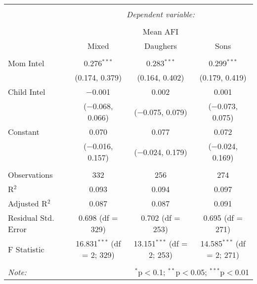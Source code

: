 
\begingroup 
\small 
\begin{tabular}{@{\extracolsep{1pt}}lccc} 
\\[-1.8ex]\hline 
\hline \\[-1.8ex] 
 & \multicolumn{3}{c}{\textit{Dependent variable:}} \\ 
\cline{2-4} 
\\[-1.8ex] & \multicolumn{3}{c}{Mean AFI} \\ 
 & Mixed & Daughers & Sons \\ 
\hline \\[-1.8ex] 
 Mom Intel & 0.276$^{***}$ & 0.283$^{***}$ & 0.299$^{***}$ \\ 
  & (0.174, 0.379) & (0.164, 0.402) & (0.179, 0.419) \\ 
  Child Intel & $-$0.001 & 0.002 & 0.001 \\ 
  & ($-$0.068, 0.066) & ($-$0.075, 0.079) & ($-$0.073, 0.075) \\ 
  Constant & 0.070 & 0.077 & 0.072 \\ 
  & ($-$0.016, 0.157) & ($-$0.024, 0.179) & ($-$0.024, 0.169) \\ 
 \hline \\[-1.8ex] 
Observations & 332 & 256 & 274 \\ 
R$^{2}$ & 0.093 & 0.094 & 0.097 \\ 
Adjusted R$^{2}$ & 0.087 & 0.087 & 0.091 \\ 
Residual Std. Error & 0.698 (df = 329) & 0.702 (df = 253) & 0.695 (df = 271) \\ 
F Statistic & 16.831$^{***}$ (df = 2; 329) & 13.151$^{***}$ (df = 2; 253) & 14.585$^{***}$ (df = 2; 271) \\ 
\hline 
\hline \\[-1.8ex] 
\textit{Note:}  & \multicolumn{3}{r}{$^{*}$p$<$0.1; $^{**}$p$<$0.05; $^{***}$p$<$0.01} \\ 
\end{tabular} 
\endgroup 
